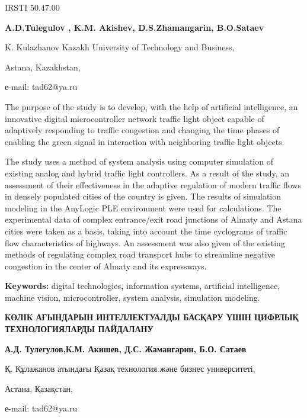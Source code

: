 IRSTI 50.47.00


\begin{center}
{\bfseries A.D.Tulegulov , K.M. Akishev, D.S.Zhamangarin, B.O.Sataev}

K. Kulazhanov Kazakh University of Technology and Business,

Astana, Kazakhstan,

е-mail: tad62@ya.ru
\end{center}

The purpose of the study is to develop, with the help of artificial
intelligence, an innovative digital microcontroller network traffic
light object capable of adaptively responding to traffic congestion and
changing the time phases of enabling the green signal in interaction
with neighboring traffic light objects.

The study uses a method of system analysis using computer simulation of
existing analog and hybrid traffic light controllers. As a result of the
study, an assessment of their effectiveness in the adaptive regulation
of modern traffic flows in densely populated cities of the country is
given. The results of simulation modeling in the AnyLogic PLE
environment were used for calculations. The experimental data of complex
entrance/exit road junctions of Almaty and Astana cities were taken as a
basis, taking into account the time cyclograms of traffic flow
characteristics of highways. An assessment was also given of the
existing methods of regulating complex road transport hubs to streamline
negative congestion in the center of Almaty and its expressways.

{\bfseries Keywords:} digital technologies{\bfseries ,} information systems,
artificial intelligence, machine vision, microcontroller, system
analysis, simulation modeling.

\begin{center}
{\large\bfseries КӨЛІК АҒЫНДАРЫН ИНТЕЛЛЕКТУАЛДЫ БАСҚАРУ ҮШІН ЦИФРЛЫҚ
ТЕХНОЛОГИЯЛАРДЫ ПАЙДАЛАНУ}

{\bfseries А.Д. Тулегулов,К.М. Акишев, Д.С. Жамангарин, Б.О. Сатаев}

Қ. Құлажанов атындағы Қазақ технология және бизнес университеті,

Астана, Қазақстан,

е-mail: tad62@ya.ru
\end{center}

